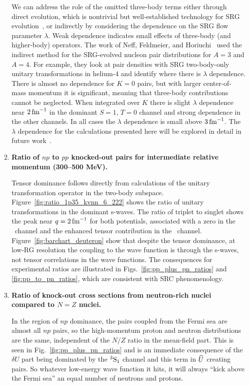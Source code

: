 \documentclass[10pt,aps,prc,floatfix,twocolumn,nofootinbib]{revtex4-1}
\begin{document}
\begin{enumerate}
   We can address the role of the omitted three-body terms either through direct evolution, which is nontrivial but well-established technology for SRG evolution~\cite{Jurgenson:2009qs}, or indirectly by considering the dependence on the SRG flow parameter $\lambda$. Weak dependence indicates small effects of three-body (and higher-body) operators.
   The work of Neff, Feldmeier, and Horiuchi~\cite{Neff:2015xda} used the indirect method for the SRG-evolved nucleon pair distributions for $A=3$ and $A=4$. 
   For example, they look at pair densities with SRG two-body-only unitary transformations in helium-4 and identify where there is $\lambda$ dependence. 
    There is almost no dependence for $K=0$ pairs, but with larger center-of-mass momentum it is significant, meaning that three-body contributions cannot be neglected.
    When integrated over $K$ there is slight $\lambda$ dependence near $2\,\mbox{fm}^{-1}$ in the dominant $S=1,\,T=0$ channel and strong dependence in the other channels. 
    In all cases the $\lambda$ dependence is small above $3\,\mbox{fm}^{-1}$.
   The $\lambda$ dependence for the calculations presented here will be explored in detail in future work~\cite{Tropiano:2021prep}.

  \item \textbf{Ratio of $np$ to $pp$ knocked-out pairs for intermediate relative momentum (300--500 MeV).}

    Tensor dominance follows directly from calculations of the unitary transformation operator in the two-body subspace.
    Figure~\ref{fig:ratio_1p35_kvnn_6_222} shows the ratio of unitary transformations in the dominant s-waves. 
    The ratio of triplet to singlet shows the peak near $q = 2\,\mbox{fm}^{-1}$ for both potentials, associated with a zero in the \singletS\ channel and the enhanced tensor contribution in the \tripletS\ channel.
    Figure~\ref{fig:barchart_deuteron}  show that despite the tensor dominance, at low-RG resolution the coupling to the wave function is through the s-waves, not tensor correlations in the wave functions.
    The consequences for experimental ratios are illustrated in Figs.~\ref{fig:pp_plus_pn_ratios} and \ref{fig:pp_to_pn_ratios}, which are consistent with SRC phenomenology.

   \item \textbf{Ratio of knock-out cross sections from neutron-rich nuclei compared to $N=Z$ nuclei.}

    In the region of $np$ dominance, the pairs coupled from the Fermi sea are almost all $np$ pairs, so the high-momentum proton and neutron distributions are the same, independent of the $N/Z$ ratio in the mean-field part.
    This is seen in Fig.~\ref{fig:pp_plus_pn_ratios} and is an immediate consequence of the $\delta U$ part being dominated by the $^3\mbox{S}_1$ channel and this term in $\widehat U$ creating pairs. 
    So whatever low-energy wave function it hits, it will always ``kick above the Fermi sea'' an equal number of neutrons and protons.


\end{enumerate}
\end{document}
